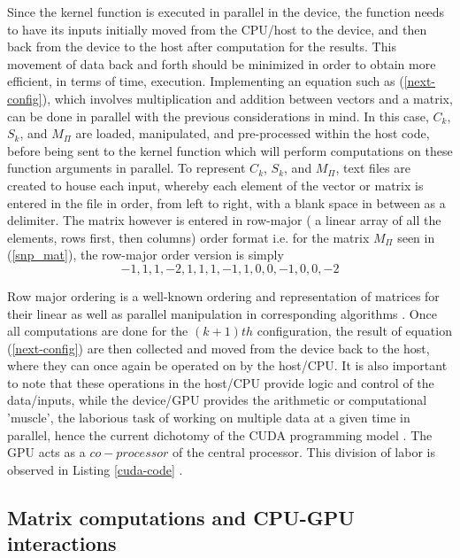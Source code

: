 \documentclass{svmultm}
\newcommand{\sredmark}[2]{\color{red} \sout{#1} #2 \color{black}}
\begin{document}
Since the kernel function is executed in parallel in
the device, the function needs to have its {inputs}
initially moved from the CPU/host to the device, and then back from the device to the
host after computation { for the results}. This movement of data back and forth should be minimized in order to obtain more efficient,
in terms of time, execution.
Implementing an equation such as (\ref{next-config}), which involves
multiplication and addition between vectors and a matrix,
can be done in parallel with the previous considerations in
mind. In this case, $C_k$, $S_k$, and $M_{\Pi}$ are loaded, manipulated, and pre-processed within the host code,
before being sent to the kernel function which will perform
computations on these function arguments in parallel.
To represent $C_k$, $S_k$, and $M_{\Pi}$, text files are created 
to house each input, whereby each element of the
vector or matrix is entered in the file in order, from left to right, with a blank space in between as a delimiter. The
matrix however is entered in row-major ( a linear array of all
the elements, rows first, then columns) order format i.e. for
the matrix $M_{\Pi}$ seen in (\ref{snp_mat}), the row-major order version is simply
\begin{equation}\label{row-maj}
-1, 1, 1, -2, 1, 1, 1, -1, 1, 0, 0, -1, 0, 0, -2
\end{equation}

Row major ordering is a well-known ordering and
representation of matrices for their linear as well as parallel
manipulation in corresponding algorithms \cite{cudabook}. Once all
computations are done for the $(k+1)th$ configuration, the result of
equation (\ref{next-config}) are then collected and moved from the
device back to the host, where they can once again be
operated on by the host/CPU. It is also important to note
that these operations in the host/CPU provide logic and
control of the data/inputs, while the device/GPU provides
the arithmetic or computational 'muscle', the laborious task
of working on multiple data at a given time in parallel,
hence the current dichotomy of the CUDA programming model \cite{sat}. The GPU acts as a $co-processor$ of the central processor.
This division of labor is observed in Listing \ref{cuda-code} .

\subsection{Matrix computations and CPU-{GPU} interactions}
\end{document}
